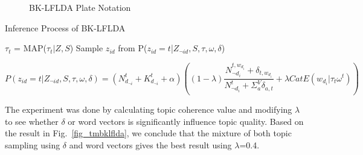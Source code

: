 \documentclass[senior]{IPSstyle}
\begin{document}
\begin{figure}[h]
	\centering
	\caption{BK-LFLDA Plate Notation}
\label{fig_bklflda}
\end{figure}

\begin{algorithm}[h]
\caption{Inference Process of BK-LFLDA}
\label{alg:bklflda}
\begin{algorithmic}[1]
\State $\tau_t$ = MAP($\tau_t | Z,S$) 
\EndFor
{} 
\State Sample $z_{id}$ from P($z_{id}=t$|$Z_{\neg id},S,\tau,\omega,\delta$)
\EndFor
\EndFor
\EndFor
\end{algorithmic}
\end{algorithm}

\begin{equation}
P(z_{id} = t | Z_{\neg id},S,\tau,\omega,\delta) = (N^{t}_{d_{\neg i}} + K^{t}_{d_{\neg i}} + \alpha)((1-\lambda)\frac{N^{t,w_{d_i}}_{\neg  d_i}+\delta_{t,w_{d_i}}}{N^{t}_{\neg d_i}+\Sigma_a^V \delta_{a,t}}+\lambda CatE(w_{d_i}|\tau_t\omega^t))
\label{c_tsbklflda}
\end{equation}


The experiment was done by calculating topic coherence value and modifying $\lambda$ to see whether $\delta$ or word vectors is significantly influence topic quality. Based on the result in Fig.~\ref{fig_tmbklflda}, we conclude that the mixture of both topic sampling using $\delta$  and word vectors gives the best result using $\lambda$=0.4.
\end{document}
